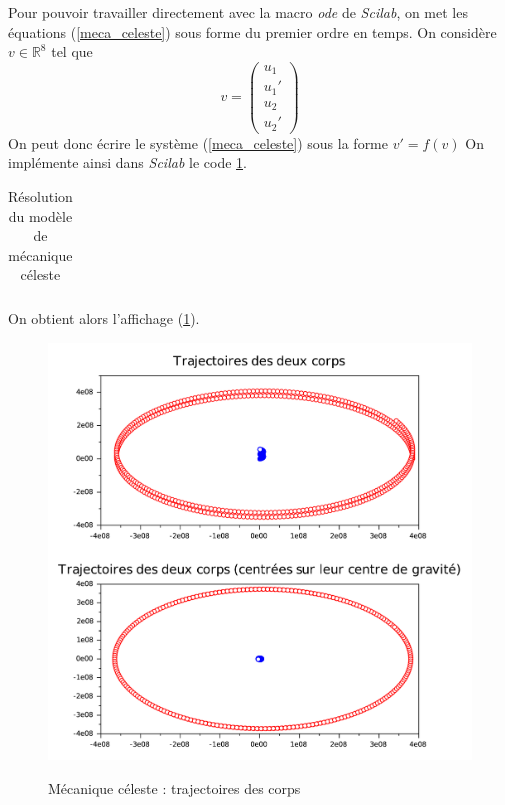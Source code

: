 \documentclass[a4paper,10pt]{report}
\begin{document}
Pour pouvoir travailler directement avec la macro \textit{ode} de \textit{Scilab}, on met les équations (\ref{meca_celeste}) sous forme du premier ordre en temps. On considère $v \in \mathbb{R}^8$ tel que
\begin{equation}
v=\left( \begin{array}{c} u_1 \\ u_1' \\ u_2 \\ u_2' \end{array} \right)
\end{equation}
On peut donc écrire le système (\ref{meca_celeste}) sous la forme $v'=f(v)$ On implémente ainsi dans \textit{Scilab} le code \ref{code_celeste_1}.
\begin{table}[H]
\caption{Résolution du modèle de mécanique céleste}
\begin{tabular}{l}

\label{code_celeste_1}
\end{tabular}
\end{table}

On obtient alors l'affichage (\ref{aff_celeste}).
\begin{figure}[H]
\centering
\caption{Mécanique céleste : trajectoires des corps}
\includegraphics[width=\textwidth]{celeste.pdf}
\label{aff_celeste}
\end{figure}
\end{document}
